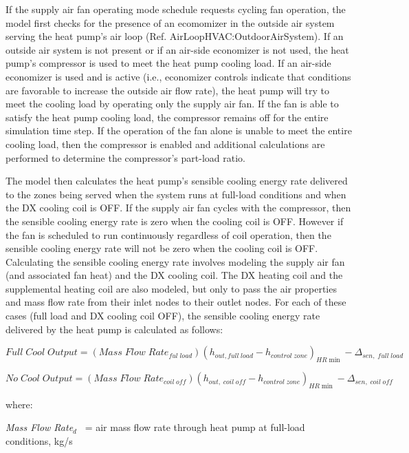 If the supply air fan operating mode schedule requests cycling fan operation, the model first checks for the presence of an ecomomizer in the outside air system serving the heat pump's air loop (Ref. AirLoopHVAC:OutdoorAirSystem). If an outside air system is not present or if an air-side economizer is not used, the heat pump's compressor is used to meet the heat pump cooling load. If an air-side economizer is used and is active (i.e., economizer controls indicate that conditions are favorable to increase the outside air flow rate), the heat pump will try to meet the cooling load by operating only the supply air fan. If the fan is able to satisfy the heat pump cooling load, the compressor remains off for the entire simulation time step. If the operation of the fan alone is unable to meet the entire cooling load, then the compressor is enabled and additional calculations are performed to determine the compressor's part-load ratio.

The model then calculates the heat pump's sensible cooling energy rate delivered to the zones being served when the system runs at full-load conditions and when the DX cooling coil is OFF. If the supply air fan cycles with the compressor, then the sensible cooling energy rate is zero when the cooling coil is OFF. However if the fan is scheduled to run continuously regardless of coil operation, then the sensible cooling energy rate will not be zero when the cooling coil is OFF. Calculating the sensible cooling energy rate involves modeling the supply air fan (and associated fan heat) and the DX cooling coil. The DX heating coil and the supplemental heating coil are also modeled, but only to pass the air properties and mass flow rate from their inlet nodes to their outlet nodes. For each of these cases (full load and DX cooling coil OFF), the sensible cooling energy rate delivered by the heat pump is calculated as follows:

\begin{equation}
Full\;Cool\;Output = (Mass\;Flow\;Rat{e_{ful\;load}}){({h_{out,full\;load}} - {h_{control\;zone}})_{HR\min }} - {\Delta_{sen,\;full\;load}}
\end{equation}

\begin{equation}
No\;Cool\;Output = (Mass\;Flow\;Rat{e_{coil\;off}}){({h_{out,\;coil\;off}} - {h_{control\;zone}})_{HR\min }} - {\Delta_{sen,\;coil\;off}}
\end{equation}

where:

\emph{Mass Flow Rate\(_{d}\)}~ = air mass flow rate through heat pump at full-load conditions, kg/s

